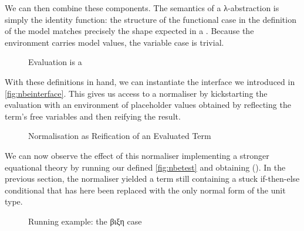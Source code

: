 We can then combine these components. The semantics of a λ-abstraction is
simply the identity function: the structure of the functional case in the
definition of the model matches precisely the shape expected in a
. Because the environment carries model values, the
variable case is trivial.

\begin{figure}[h]
\caption{Evaluation is a \label{fig:evalnbe}}
\end{figure}

With these definitions in hand, we can instantiate the  interface we
introduced in \cref{fig:nbeinterface}. This gives us access to a normaliser
by kickstarting the evaluation with an environment of placeholder values
obtained by reflecting the term's free variables and then reifying the
result.

\begin{figure}[h]
\caption{Normalisation as Reification of an Evaluated Term\label{fig:normnbe}}
\end{figure}

We can now observe the effect of this normaliser implementing a stronger
equational theory by running our  defined \cref{fig:nbetest} and
obtaining {()}. In the previous section, the normaliser
yielded a term still containing a stuck if-then-else conditional that has
here been replaced with the only normal form of the unit type.

\begin{figure}[h]
\caption{Running example: the βιξη case}\label{fig:betaiotaxietatest}
\end{figure}
